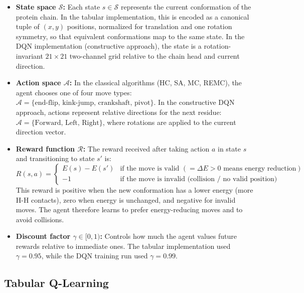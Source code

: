 \begin{itemize}
    \item \textbf{State space $\mathcal{S}$:} Each state $s \in \mathcal{S}$ represents the current conformation of the protein chain. In the tabular implementation, this is encoded as a canonical tuple of $(x,y)$ positions, normalized for translation and one rotation symmetry, so that equivalent conformations map to the same state. In the DQN implementation (constructive approach), the state is a rotation-invariant $21 \times 21$ two-channel grid relative to the chain head and current direction.
    \item \textbf{Action space $\mathcal{A}$:} In the classical algorithms (HC, SA, MC, REMC), the agent chooses one of four move types: $\mathcal{A} = \{\text{end-flip},\, \text{kink-jump},\, \text{crankshaft},\, \text{pivot}\}$. In the constructive DQN approach, actions represent relative directions for the next residue: $\mathcal{A} = \{\text{Forward},\, \text{Left},\, \text{Right}\}$, where rotations are applied to the current direction vector.
    \item \textbf{Reward function $\mathcal{R}$:} The reward received after taking action $a$ in state $s$ and transitioning to state $s'$ is:
    \begin{equation}
        R(s, a) =
        \begin{cases}
            E(s) - E(s') & \text{if the move is valid } (= \Delta E > 0 \text{ means energy reduction})\\
            -1 & \text{if the move is invalid (collision / no valid position)}
        \end{cases}
        \label{eq:reward}
    \end{equation}
    This reward is positive when the new conformation has a lower energy (more H-H contacts), zero when energy is unchanged, and negative for invalid moves. The agent therefore learns to prefer energy-reducing moves and to avoid collisions.
    \item \textbf{Discount factor $\gamma \in [0,1)$:} Controls how much the agent values future rewards relative to immediate ones. The tabular implementation used $\gamma = 0.95$, while the DQN training run used $\gamma = 0.99$.
\end{itemize}

\subsection{Tabular Q-Learning}
\label{cap2:subsec_qlearning}

